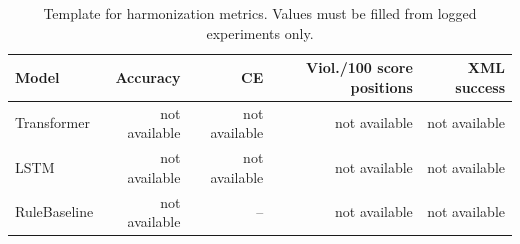 \begin{table}[t]
\centering
\caption{Template for harmonization metrics. Values must be filled from logged experiments only.}
\begin{tabular}{lrrrr}
\toprule
Model & Accuracy & CE & Viol./100 score positions & XML success \\
\midrule
Transformer & not available & not available & not available & not available \\
LSTM & not available & not available & not available & not available \\
RuleBaseline & not available & -- & not available & not available \\
\bottomrule
\end{tabular}
\end{table}
